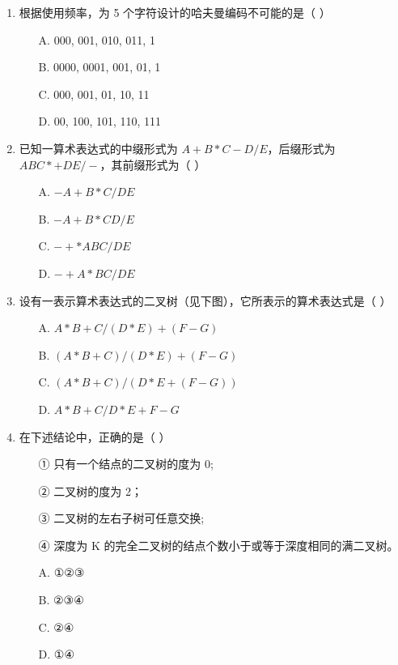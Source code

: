 \documentclass[12pt, a4paper]{article}
\begin{document}
\begin{enumerate}[label=\arabic*.]
	\item 根据使用频率，为 5 个字符设计的哈夫曼编码不可能的是（ ）
	      \begin{enumerate}
		      \item[A.] 000, 001, 010, 011, 1
		      \item[B.] 0000, 0001, 001, 01, 1
		      \item[C.] 000, 001, 01, 10, 11
		      \item[D.] 00, 100, 101, 110, 111
	      \end{enumerate}

	\item 已知一算术表达式的中缀形式为 $A+B*C-D/E$，后缀形式为 $ABC*+DE/-$，其前缀形式为（ ）
	      \begin{enumerate}
		      \item[A.] $-A+B*C/DE$
		      \item[B.] $-A+B*CD/E$
		      \item[C.] $-+*ABC/DE$
		      \item[D.] $-+A*BC/DE$
	      \end{enumerate}

	\item 设有一表示算术表达式的二叉树（见下图），它所表示的算术表达式是（ ）
	      \begin{enumerate}
		      \item[A.] $A*B+C/(D*E)+(F-G)$
		      \item[B.] $(A*B+C)/(D*E)+(F-G)$
		      \item[C.] $(A*B+C)/(D*E+(F-G))$
		      \item[D.] $A*B+C/D*E+F-G$
	      \end{enumerate}

	\item 在下述结论中，正确的是（ ）
	      \begin{enumerate}
		      \item[①] 只有一个结点的二叉树的度为 0;
		      \item[②] 二叉树的度为 2；
		      \item[③] 二叉树的左右子树可任意交换;
		      \item[④] 深度为 K 的完全二叉树的结点个数小于或等于深度相同的满二叉树。
		      \item[A.] ①②③
		      \item[B.] ②③④
		      \item[C.] ②④
		      \item[D.] ①④
	      \end{enumerate}


\end{enumerate}
\end{document}
